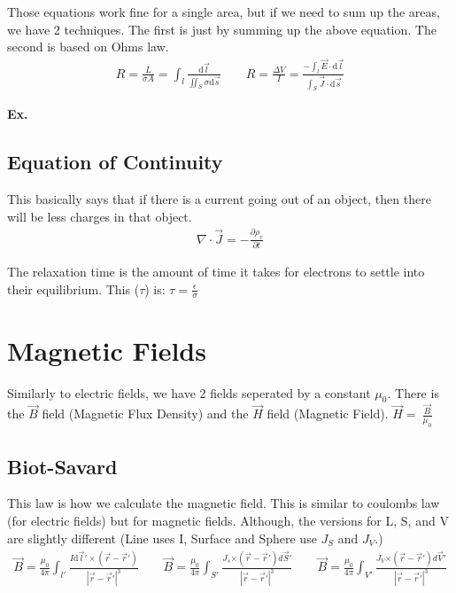 \documentclass[12pt,letterpaper]{article} \usepackage{amsmath} \usepackage{graphicx} \usepackage[margin=1in]{geometry} \usepackage{longtable}  \usepackage{amssymb}
\begin{document}
	Those equations work fine for a single area, but if we need to sum up the areas, we have 2 techniques. The first is just by summing up the above equation. The second is based on Ohms law. 
	\begin{align*}
		 R = \frac{L}{\sigma A} = \int_l \frac{\mathrm d \vec l}{\iint_S \sigma \mathrm d \vec s} \qquad R = \frac{\Delta V}{I} = \frac{-\int_l \vec E \cdot \mathrm d \vec l}{\int_S \vec J \cdot \mathrm d \vec s} 
	\end{align*}

	\begin{mdframed}
		\textbf{Ex. }
	\end{mdframed}
	
	\subsection{Equation of Continuity}
	This basically says that if there is a current going out of an object, then there will be less charges in that object. 
	\begin{align*}
		\nabla \cdot \vec J = -\frac{\partial \rho_v}{\partial t}
	\end{align*}

	The relaxation time is the amount of time it takes for electrons to settle into their equilibrium. This ($\tau$) is: $\tau = \frac{\epsilon}{\sigma}$
	
	\section{Magnetic Fields}
	Similarly to electric fields, we have 2 fields seperated by a constant $\mu_0$. There is the $\vec B$ field (Magnetic Flux Density) and the $\vec H$ field (Magnetic Field). $\vec H = \ \frac{\vec B}{\mu_0}$
	
	\subsection{Biot-Savard}
	This law is how we calculate the magnetic field. This is similar to coulombs law (for electric fields) but for magnetic fields. Although, the versions for L, S, and V are slightly different (Line uses I, Surface and Sphere use $J_S$ and $J_V$.)
	\begin{align*}
		\vec B = \frac{\mu_0}{4\pi}\int_{l\prime}\frac{I\mathrm d \vec l\prime \times (\vec r - \vec r\prime)}{|\vec r - \vec r\prime |^3} \qquad \vec B = \frac{\mu_0}{4\pi}\int_{S\prime}\frac{J_s\mathrm \times (\vec r - \vec r\prime)d \vec S\prime}{|\vec r - \vec r\prime |^3} \qquad \vec B = \frac{\mu_0}{4\pi}\int_{V\prime}\frac{J_V\mathrm \times (\vec r - \vec r\prime)d \vec V\prime}{|\vec r - \vec r\prime |^3}
	\end{align*}
\end{document}
